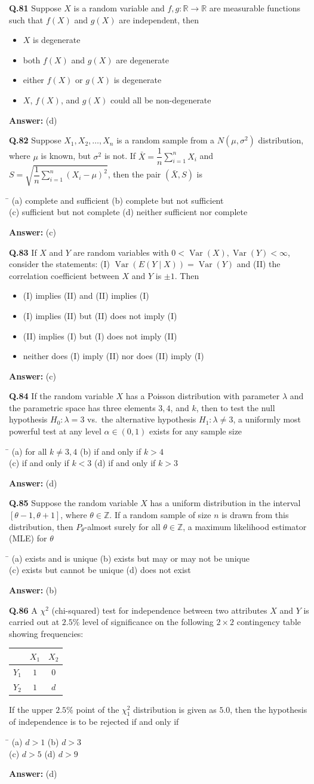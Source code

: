 \documentclass[11pt,a4paper]{article}
\newcommand{\optsfour}[4]{%
  \begin{tabbing}
    \hspace{0.48\linewidth}\=\kill
    (a) #1 \> (b) #2 \\[2pt]
    (c) #3 \> (d) #4
  \end{tabbing}%
}
\newcommand{\optslist}[4]{%
  \begin{itemize}
    \setlength{\itemsep}{2pt}\setlength{\parskip}{0pt}
    \item[(a)] #1
    \item[(b)] #2
    \item[(c)] #3
    \item[(d)] #4
  \end{itemize}%
}
\newcommand{\ans}[1]{\textbf{Answer:} #1\par\medskip}
\begin{document}
\textbf{Q.81} Suppose $X$ is a random variable and $f, g : \mathbb{R} \to \mathbb{R}$ are measurable functions such that $f(X)$ and $g(X)$ are independent, then
\optslist{$X$ is degenerate}{both $f(X)$ and $g(X)$ are degenerate}{either $f(X)$ or $g(X)$ is degenerate}{$X$, $f(X)$, and $g(X)$ could all be non-degenerate}
\ans{(d)}

\textbf{Q.82} Suppose $X_1, X_2, \dots, X_n$ is a random sample from a $N(\mu, \sigma^2)$ distribution, where $\mu$ is known, but $\sigma^2$ is not. If $\bar{X} = \dfrac{1}{n}\displaystyle\sum_{i=1}^{n} X_i$ and $S = \sqrt{\dfrac{1}{n}\displaystyle\sum_{i=1}^{n} (X_i - \mu)^2}$, then the pair $(\bar{X}, S)$ is
\optsfour{complete and sufficient}{complete but not sufficient}{sufficient but not complete}{neither sufficient nor complete}
\ans{(c)}

\textbf{Q.83} If $X$ and $Y$ are random variables with $0 < \operatorname{Var}(X), \operatorname{Var}(Y) < \infty$, consider the statements: (I) $\operatorname{Var}(E(Y \mid X)) = \operatorname{Var}(Y)$ and (II) the correlation coefficient between $X$ and $Y$ is $\pm 1$. Then
\optslist{(I) implies (II) and (II) implies (I)}{(I) implies (II) but (II) does not imply (I)}{(II) implies (I) but (I) does not imply (II)}{neither does (I) imply (II) nor does (II) imply (I)}
\ans{(c)}

\textbf{Q.84} If the random variable $X$ has a Poisson distribution with parameter $\lambda$ and the parametric space has three elements $3, 4$, and $k$, then to test the null hypothesis $H_0 : \lambda = 3$ vs.\ the alternative hypothesis $H_1 : \lambda \ne 3$, a uniformly most powerful test at any level $\alpha \in (0, 1)$ exists for any sample size
\optsfour{for all $k \ne 3, 4$}{if and only if $k > 4$}{if and only if $k < 3$}{if and only if $k > 3$}
\ans{(d)}

\textbf{Q.85} Suppose the random variable $X$ has a uniform distribution in the interval $[\theta - 1, \theta + 1]$, where $\theta \in \mathbb{Z}$. If a random sample of size $n$ is drawn from this distribution, then $P_\theta$-almost surely for all $\theta \in \mathbb{Z}$, a maximum likelihood estimator (MLE) for $\theta$
\optsfour{exists and is unique}{exists but may or may not be unique}{exists but cannot be unique}{does not exist}
\ans{(b)}

\textbf{Q.86} A $\chi^2$ (chi-squared) test for independence between two attributes $X$ and $Y$ is carried out at $2.5\%$ level of significance on the following $2 \times 2$ contingency table showing frequencies:
\begin{center}
\begin{tabular}{ccc}
  \toprule
  & $X_1$ & $X_2$ \\
  \midrule
  $Y_1$ & $1$ & $0$ \\
  $Y_2$ & $1$ & $d$ \\
  \bottomrule
\end{tabular}
\end{center}
If the upper $2.5\%$ point of the $\chi_1^2$ distribution is given as $5.0$, then the hypothesis of independence is to be rejected if and only if
\optsfour{$d > 1$}{$d > 3$}{$d > 5$}{$d > 9$}
\ans{(d)}
\end{document}
